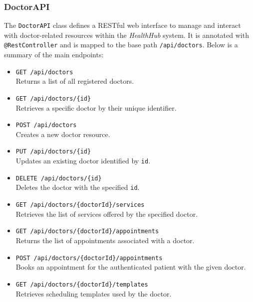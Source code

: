 \subsubsection{DoctorAPI}
The \texttt{DoctorAPI} class defines a RESTful web interface to manage and interact with doctor-related resources within the \textit{HealthHub} system. It is annotated with \texttt{@RestController} and is mapped to the base path \texttt{/api/doctors}. Below is a summary of the main endpoints:

\begin{itemize}
	\item \texttt{GET /api/doctors} \\
	Returns a list of all registered doctors.
	
	\item \texttt{GET /api/doctors/\{id\}} \\
	Retrieves a specific doctor by their unique identifier.
	
	\item \texttt{POST /api/doctors} \\
	Creates a new doctor resource.
	
	\item \texttt{PUT /api/doctors/\{id\}} \\
	Updates an existing doctor identified by \texttt{id}.
	
	\item \texttt{DELETE /api/doctors/\{id\}} \\
	Deletes the doctor with the specified \texttt{id}.
	
	\item \texttt{GET /api/doctors/\{doctorId\}/services} \\
	Retrieves the list of services offered by the specified doctor.
	
	\item \texttt{GET /api/doctors/\{doctorId\}/appointments} \\
	Returns the list of appointments associated with a doctor.
	
	\item \texttt{POST /api/doctors/\{doctorId\}/appointments} \\
	Books an appointment for the authenticated patient with the given doctor.
	
	\item \texttt{GET /api/doctors/\{doctorId\}/templates} \\
	Retrieves scheduling templates used by the doctor.
	

\end{itemize}
